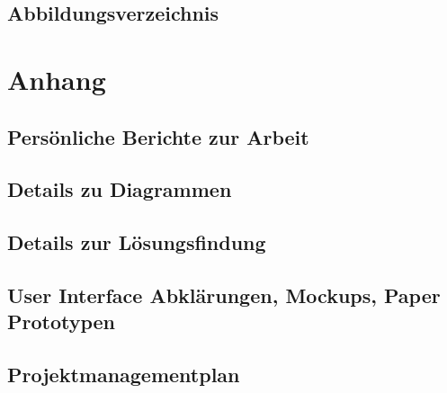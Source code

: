 \documentclass[12pt, a4paper]{report}
\begin{document}
	\printglossaries
	
	
	\chapter{Abbildungsverzeichnis}
	\listoffigures
	
	
	
	\part{Anhang}
	
	
	\chapter{Persönliche Berichte zur Arbeit}
	
	\chapter{Details zu Diagrammen}
	
	\chapter{Details zur Lösungsfindung}
	
	\chapter{User Interface Abklärungen, Mockups, Paper Prototypen}
	
	\chapter{Projektmanagementplan}
	
	
\end{document}
